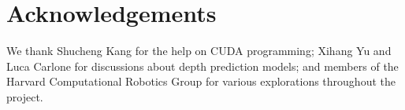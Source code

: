\section*{Acknowledgements}

We thank Shucheng Kang for the help on CUDA programming; Xihang Yu and Luca Carlone for discussions about depth prediction models; and members of the Harvard Computational Robotics Group for various explorations throughout the project.